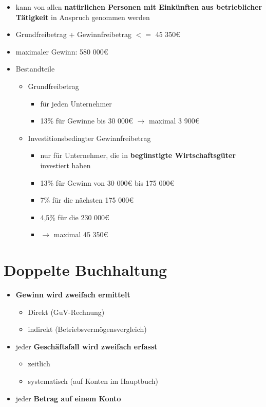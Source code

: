 \documentclass[a4paper, ngerman]{article}
\begin{document}
\begin{itemize}
    \item kann von allen \textbf{natürlichen Personen mit Einkünften aus betrieblicher Tätigkeit} in Anspruch genommen werden
    \item Grundfreibetrag + Gewinnfreibetrag $<=$ 45 350€
    \item maximaler Gewinn: 580 000€
    \item Bestandteile
          \begin{itemize}
              \item Grundfreibetrag
                    \begin{itemize}
                        \item für jeden Unternehmer
                        \item 13\% für Gewinne bis 30 000€ $\rightarrow$ maximal 3 900€
                    \end{itemize}
              \item Investitionsbedingter Gewinnfreibetrag
                    \begin{itemize}
                        \item nur für Unternehmer, die in \textbf{begünstigte Wirtschaftsgüter} investiert haben
                        \item 13\% für Gewinn von 30 000€ bis 175 000€
                        \item 7\% für die nächsten 175 000€
                        \item 4,5\% für die 230 000€
                        \item $\rightarrow$ maximal 45 350€
                    \end{itemize}
          \end{itemize}
\end{itemize}

\section{Doppelte Buchhaltung}
\begin{itemize}
    \item \textbf{Gewinn wird zweifach ermittelt}
          \begin{itemize}
              \item Direkt (GuV-Rechnung)
              \item indirekt (Betriebsvermögensvergleich)
          \end{itemize}
    \item jeder \textbf{Geschäftsfall wird zweifach erfasst}
          \begin{itemize}
              \item zeitlich
              \item systematisch (auf Konten im Hauptbuch)
          \end{itemize}
    \item jeder \textbf{Betrag auf einem Konto}
\end{itemize}
\end{document}
